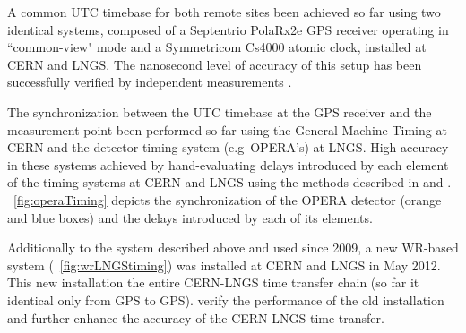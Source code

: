 A common UTC timebase for both remote sites  been achieved so far using two identical 
systems, composed of a Septentrio PolaRx2e \cite{biblio:PolaRx2e} GPS receiver operating in 
``common-view" mode and a Symmetricom Cs4000 \cite{biblio:CS4000}  atomic clock, installed at 
CERN and LNGS. The nanosecond level of accuracy of this setup has been successfully verified by 
independent measurements \cite{biblio:TOF}. 

The synchronization between the UTC timebase at the GPS receiver and the measurement point 
been performed so far using the General Machine Timing at CERN and the detector timing system 
(e.g~OPERA's) at LNGS. High accuracy in these systems  achieved by hand-evaluating delays introduced 
by each element of the timing systems at CERN and LNGS using the methods described in 
\cite{biblio:TOF} and \cite{biblio:BECOHT_CNGS}. 
\figurename~\ref{fig:operaTiming} depicts the synchronization of the OPERA \cite{biblio:TOF} 
detector (orange and blue boxes) and the delays introduced by each of its elements. 

Additionally to the system described above and used since 2009, a new WR-based system 
(\figurename~\ref{fig:wrLNGStiming}) was installed at CERN and LNGS in May 2012. This new 
installation
 the entire CERN-LNGS time transfer chain
(so far it  identical only from GPS to GPS). 
 verify 
the performance of the old installation and further enhance the accuracy of the CERN-LNGS 
time transfer. 













